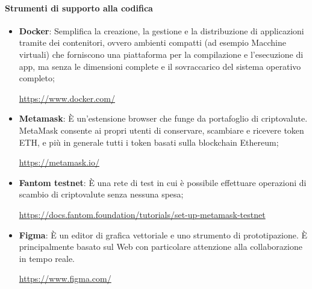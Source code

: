 \paragraph{Strumenti di supporto alla codifica}
\begin{itemize}
    \item \textbf{Docker}: Semplifica la creazione, la gestione e la distribuzione di applicazioni tramite dei contenitori, ovvero ambienti compatti (ad esempio Macchine virtuali) che forniscono una piattaforma per la compilazione e l'esecuzione di app, ma senza le dimensioni complete e il sovraccarico del sistema operativo completo;
          \begin{center}\url{https://www.docker.com/}\end{center}
    \item \textbf{Metamask}: È un'estensione browser che funge da portafoglio di criptovalute\glo{}. MetaMask consente ai propri utenti di conservare, scambiare e ricevere token\glo{} ETH, e più in generale tutti i token\glo{} basati sulla blockchain\glo{} Ethereum\glo{};
          \begin{center}\url{https://metamask.io/}\end{center}
    \item \textbf{Fantom testnet}: È una rete di test in cui è possibile effettuare operazioni di scambio di criptovalute\glo{} senza nessuna spesa;
          \begin{center}\url{https://docs.fantom.foundation/tutorials/set-up-metamask-testnet}\end{center}
    \item \textbf{Figma}: È un editor di grafica vettoriale e uno strumento di prototipazione. È principalmente basato sul Web con particolare attenzione alla collaborazione in tempo reale.
          \begin{center}\url{https://www.figma.com/}\end{center}
\end{itemize}